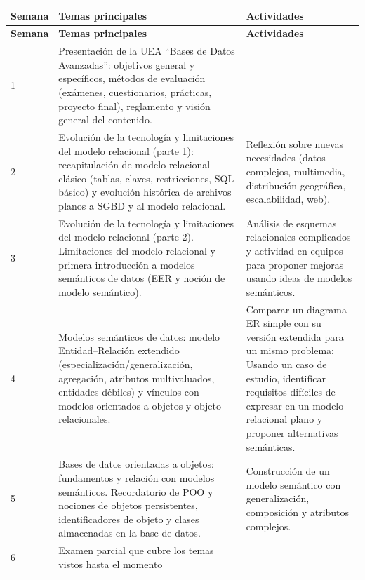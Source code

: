 \documentclass[12pt]{article}
\begin{document}
\setlength{\extrarowheight}{2pt}
\begin{longtable}{|>{\centering\arraybackslash}p{1.2cm}|p{7.2cm}|p{7.2cm}|}
	\hline
	\textbf{Semana} & \textbf{Temas principales} & \textbf{Actividades} \\
	\hline
	\endfirsthead
	\hline
	\textbf{Semana} & \textbf{Temas principales} & \textbf{Actividades} \\
	\hline
	\endhead
	
	1 &
	Presentación de la UEA “Bases de Datos Avanzadas”: objetivos general y específicos, métodos de evaluación (exámenes, cuestionarios, prácticas, proyecto final), reglamento y visión general del contenido. & \\ 
	\hline
	
	2 &
	Evolución de la tecnología y limitaciones del modelo relacional (parte 1): recapitulación de modelo relacional clásico (tablas, claves, restricciones, SQL básico) y evolución histórica de archivos planos a SGBD y al modelo relacional. &
	Reflexión sobre nuevas necesidades (datos complejos, multimedia, distribución geográfica, escalabilidad, web). \\
	\hline
	
	3 &
	Evolución de la tecnología y limitaciones del modelo relacional (parte 2). Limitaciones del modelo relacional y primera introducción a modelos semánticos de datos (EER y noción de modelo semántico). &
	Análisis de esquemas relacionales complicados y actividad en equipos para proponer mejoras usando ideas de modelos semánticos. \\
	\hline
	
	4 &
	Modelos semánticos de datos: modelo Entidad–Relación extendido (especialización/generalización, agregación, atributos multivaluados, entidades débiles) y vínculos con modelos orientados a objetos y objeto–relacionales. &
	Comparar un diagrama ER simple con su versión extendida para un mismo problema; Usando un caso de estudio, identificar requisitos difíciles de expresar en un modelo relacional plano y proponer alternativas semánticas. \\
	\hline
	
	5 &
	Bases de datos orientadas a objetos: fundamentos y relación con modelos semánticos. Recordatorio de POO y nociones de objetos persistentes, identificadores de objeto y clases almacenadas en la base de datos. &
	Construcción de un modelo semántico con generalización, composición y atributos complejos. \\
	\hline
	
	6 &
	Examen parcial que cubre los temas vistos hasta el momento & \\
	\hline
	

\end{longtable}
\end{document}
